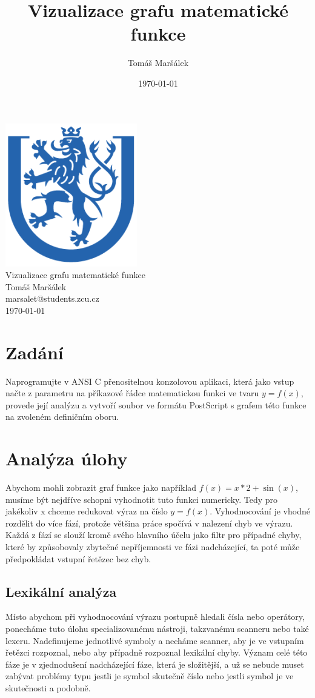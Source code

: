 \documentclass[11pt]{article}
\title{Vizualizace grafu matematické funkce}
\author{Tomáš Maršálek}
\date{\today}
\begin{document}
\begin{titlepage}
\begin{center}
	\includegraphics{res/znak_vzor.png} \\[2cm]
	\huge{Vizualizace grafu matematické funkce} \\[2cm]
	\Large{Tomáš Maršálek} \\
	\large{marsalet@students.zcu.cz} \\[1cm]
	\normalsize{\today}
\end{center}
\end{titlepage}

\section{Zadání}
Naprogramujte v ANSI C přenositelnou konzolovou aplikaci, která jako vstup
načte z parametru na příkazové řádce matematickou funkci ve tvaru $y = f(x)$,
provede její analýzu a vytvoří soubor ve formátu PostScript s grafem této
funkce na zvoleném definičním oboru.

\section{Analýza úlohy}
Abychom mohli zobrazit graf funkce jako například $f(x) = x * 2 + \sin(x)$,
musíme být nejdříve schopni vyhodnotit tuto funkci numericky. Tedy pro
jakékoliv x chceme redukovat výraz na číslo $y = f(x)$. Vyhodnocování je vhodné
rozdělit do více fází, protože většina práce spočívá v nalezení chyb ve výrazu.
Každá z fází se slouží kromě svého hlavního účelu jako filtr pro případné
chyby, které by způsobovaly zbytečné nepříjemnosti ve fázi nadcházející, ta
poté může předpokládat vstupní řetězec bez chyb. 

\subsection{Lexikální analýza}
Místo abychom při vyhodnocování výrazu postupně hledali čísla nebo operátory,
ponecháme tuto úlohu specializovanému nástroji, takzvanému scanneru nebo také
lexeru. Nadefinujeme jednotlivé symboly a necháme scanner, aby je ve vstupním
řetězci rozpoznal, nebo aby případně rozpoznal lexikální chyby.  Význam celé
této fáze je v zjednodušení nadcházející fáze, která je složitější, a už se
nebude muset zabývat problémy typu jestli je symbol skutečně číslo nebo jestli
symbol  je ve skutečnosti  a podobně.
\end{document}
